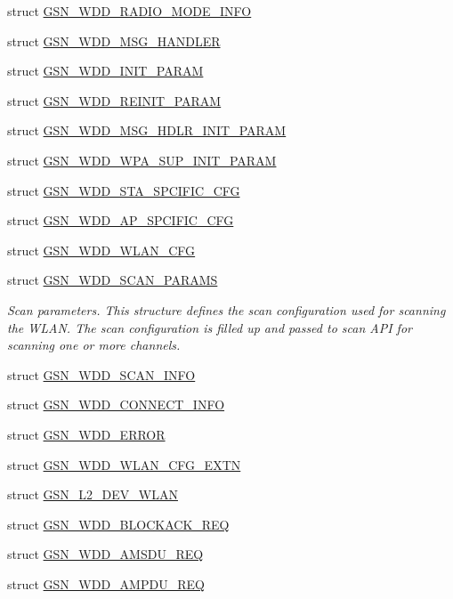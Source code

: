 \begin{DoxyCompactItemize}
struct \hyperlink{a00283}{GSN\_\-WDD\_\-RADIO\_\-MODE\_\-INFO}
\item 
struct \hyperlink{a00279}{GSN\_\-WDD\_\-MSG\_\-HANDLER}
\item 
struct \hyperlink{a00276}{GSN\_\-WDD\_\-INIT\_\-PARAM}
\item 
struct \hyperlink{a00284}{GSN\_\-WDD\_\-REINIT\_\-PARAM}
\item 
struct \hyperlink{a00280}{GSN\_\-WDD\_\-MSG\_\-HDLR\_\-INIT\_\-PARAM}
\item 
struct \hyperlink{a00304}{GSN\_\-WDD\_\-WPA\_\-SUP\_\-INIT\_\-PARAM}
\item 
struct \hyperlink{a00300}{GSN\_\-WDD\_\-STA\_\-SPCIFIC\_\-CFG}
\item 
struct \hyperlink{a00271}{GSN\_\-WDD\_\-AP\_\-SPCIFIC\_\-CFG}
\item 
struct \hyperlink{a00302}{GSN\_\-WDD\_\-WLAN\_\-CFG}
\item 
struct \hyperlink{a00286}{GSN\_\-WDD\_\-SCAN\_\-PARAMS}
\begin{DoxyCompactList}\small\item\em Scan parameters. This structure defines the scan configuration used for scanning the WLAN. The scan configuration is filled up and passed to scan API for scanning one or more channels. \end{DoxyCompactList}\item 
struct \hyperlink{a00285}{GSN\_\-WDD\_\-SCAN\_\-INFO}
\item 
struct \hyperlink{a00273}{GSN\_\-WDD\_\-CONNECT\_\-INFO}
\item 
struct \hyperlink{a00274}{GSN\_\-WDD\_\-ERROR}
\item 
struct \hyperlink{a00303}{GSN\_\-WDD\_\-WLAN\_\-CFG\_\-EXTN}
\item 
struct \hyperlink{a00108}{GSN\_\-L2\_\-DEV\_\-WLAN}
\item 
struct \hyperlink{a00272}{GSN\_\-WDD\_\-BLOCKACK\_\-REQ}
\item 
struct \hyperlink{a00270}{GSN\_\-WDD\_\-AMSDU\_\-REQ}
\item 
struct \hyperlink{a00269}{GSN\_\-WDD\_\-AMPDU\_\-REQ}
\end{DoxyCompactItemize}
